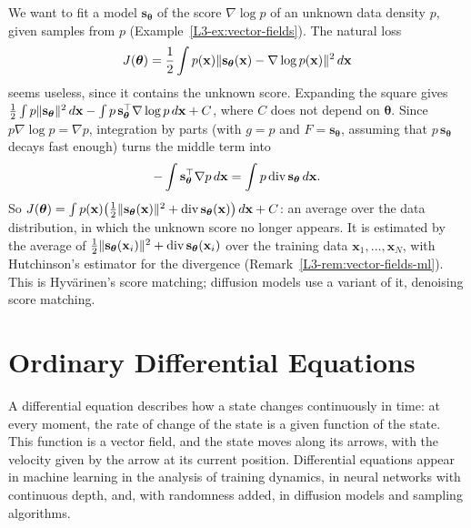 \begin{example}\label{L3-ex:score-matching}
    We want to fit a model $\mathbf{s}_{\boldsymbol{\theta}}$ of the score $\nabla\log p$ of an unknown data density $p$, given samples from $p$ (Example~\ref{L3-ex:vector-fields}). The natural loss
    \[J(\boldsymbol{\theta}) = \frac{1}{2}\int p(\mathbf{x})\lVert \mathbf{s}_{\boldsymbol{\theta}}(\mathbf{x}) - \nabla\log p(\mathbf{x}) \rVert^2\, d\mathbf{x}\]
    seems useless, since it contains the unknown score. Expanding the square gives $\frac{1}{2}\int p\lVert \mathbf{s}_{\boldsymbol{\theta}} \rVert^2\, d\mathbf{x} - \int p\,\mathbf{s}_{\boldsymbol{\theta}}^\top\nabla\log p\, d\mathbf{x} + C$, where $C$ does not depend on $\boldsymbol{\theta}$. Since $p\nabla\log p = \nabla p$, integration by parts (with $g = p$ and $F = \mathbf{s}_{\boldsymbol{\theta}}$, assuming that $p\,\mathbf{s}_{\boldsymbol{\theta}}$ decays fast enough) turns the middle term into
    \[-\int \mathbf{s}_{\boldsymbol{\theta}}^\top\nabla p\, d\mathbf{x} = \int p\operatorname{div}\mathbf{s}_{\boldsymbol{\theta}}\, d\mathbf{x}.\]
    So $J(\boldsymbol{\theta}) = \int p(\mathbf{x})\big(\frac{1}{2}\lVert \mathbf{s}_{\boldsymbol{\theta}}(\mathbf{x}) \rVert^2 + \operatorname{div}\mathbf{s}_{\boldsymbol{\theta}}(\mathbf{x})\big)\, d\mathbf{x} + C$: an average over the data distribution, in which the unknown score no longer appears. It is estimated by the average of $\frac{1}{2}\lVert \mathbf{s}_{\boldsymbol{\theta}}(\mathbf{x}_i) \rVert^2 + \operatorname{div}\mathbf{s}_{\boldsymbol{\theta}}(\mathbf{x}_i)$ over the training data $\mathbf{x}_1, \ldots, \mathbf{x}_N$, with Hutchinson's estimator for the divergence (Remark~\ref{L3-rem:vector-fields-ml}). This is Hyv\"arinen's score matching; diffusion models use a variant of it, denoising score matching.
\end{example}

\section{Ordinary Differential Equations}\label{L3-sec:ode}

A differential equation describes how a state changes continuously in time: at every moment, the rate of change of the state is a given function of the state. This function is a vector field, and the state moves along its arrows, with the velocity given by the arrow at its current position. Differential equations appear in machine learning in the analysis of training dynamics, in neural networks with continuous depth, and, with randomness added, in diffusion models and sampling algorithms.

